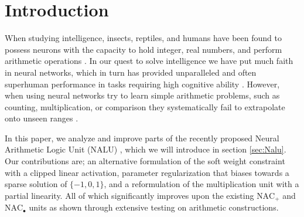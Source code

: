 \section{Introduction}
When studying intelligence, insects, reptiles, and humans have been found to possess neurons with the capacity to hold integer, real numbers, and perform arithmetic operations \cite{nieder-neuronal-number,rugani-arithmetic-chicks,gallistel-numbers-in-brain}.
In our quest to solve intelligence we have put much faith in neural networks, which in turn has provided unparalleled and often superhuman performance in tasks requiring high cognitive ability \cite{natureGo,googleNMT,resnet}.
However, when using neural networks try to learn simple arithmetic problems, such as counting, multiplication, or comparison they systematically fail to extrapolate onto unseen ranges \cite{stillNotSystematic,suzgun2019evaluating,trask-nalu}.

In this paper, we analyze and improve parts of the recently proposed Neural Arithmetic Logic Unit (NALU) \cite{trask-nalu}, which we will introduce in section \ref{sec:Nalu}. Our contributions are; an alternative formulation of the soft weight constraint with a clipped linear activation, parameter regularization that biases towards a sparse solution of $\{-1,0,1\}$, and a reformulation of the multiplication unit with a partial linearity. All of which significantly improves upon the existing $\text{NAC}_{+}$ and $\text{NAC}_{\bullet}$ units as shown through extensive testing on arithmetic constructions.

